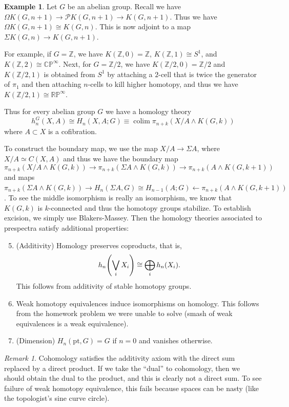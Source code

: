 \documentclass[leqno, openany]{memoir}
\theoremstyle{definition}
\newtheorem{exm}[thm]{Example}
\theoremstyle{remark}
\newtheorem{rmk}[thm]{Remark}
\theoremstyle{plain}
\theoremstyle{definition}
\theoremstyle{remark}
\newcommand{\R}{\mathbb{R}}
\newcommand{\C}{\mathbb{C}}
\newcommand{\Z}{\mathbb{Z}}
\renewcommand{\P}{\mathbb{P}}
\newcommand{\mc}[1]{\mathcal{#1}}
\newcommand{\mr}[1]{\mathrm{#1}}
\begin{document}
\begin{exm}
    Let $G$ be an abelian group. Recall we have $\Omega K(G, n+1) \to \mc{P} K(G, n+1) \to K(G, n+1)$. Thus we have $\Omega K(G, n+1) \cong K(G, n)$. This is now adjoint to a map $\Sigma K(G, n) \to K(G, n+1)$. 

    For example, if $G = \Z$, we have $K(\Z, 0) = \Z$, $K(\Z, 1) \cong S^1$, and $K(\Z, 2) \cong \C\P^{\infty}$. Next, for $G = \Z/2$, we have $K(\Z/2, 0) = \Z/2$ and $K(\Z/2, 1)$ is obtained from $S^1$ by attaching a $2$-cell that is twice the generator of $\pi_1$ and then attaching $n$-cells to kill higher homotopy, and thus we have $K(\Z/2, 1) \cong \R\P^{\infty}$. 

    Thus for every abelian group $G$ we have a homology theory 
    \[ h_n^G(X, A) \cong H_n(X,A;G) \equiv \operatorname{colim} \pi_{n+k}(X/A \wedge K(G, k)) \]
    where $A \subset X$ is a cofibration.
\end{exm}

To construct the boundary map, we use the map $X/A \to \Sigma A$, where $X/A \simeq C(X,A)$ and thus we have the boundary map
\[ \pi_{n+k}(X/A \wedge K(G, k)) \to \pi_{n+k}(\Sigma A \wedge K(G, k)) \to \pi_{n+k}(A \wedge K(G, k+1)) \]
and maps $\pi_{n+k}(\Sigma A \wedge K(G, k)) \to H_n(\Sigma A, G) \cong H_{n-1}(A;G) \gets \pi_{n+k}(A \wedge K(G, k+1))$.
To see the middle isomorphism is really an isomorphism, we know that $K(G, k)$ is $k$-connected and thus the homotopy groups stabilize. To establish excision, we simply use Blakers-Massey. Then the homology theories associated to prespectra satisfy additional properties:
\begin{enumerate}
    \setcounter{enumi}{4}
    \item (Additivity) Homology preserves coproducts, that is, 
        \[ h_n\qty(\bigvee_i X_i) \cong \bigoplus_i h_n(X_i). \]
        This follows from additivity of stable homotopy groups.
    \item Weak homotopy equivalences induce isomorphisms on homology. This follows from the homework problem we were unable to solve (smash of weak equivalences is a weak equivalence).
    \item (Dimension) $H_n(\mr{pt}, G) = G$ if $n=0$ and vanishes otherwise.
\end{enumerate}

\begin{rmk}
    Cohomology satisfies the additivity axiom with the direct sum replaced by a direct product. If we take the ``dual'' to cohomology, then we should obtain the dual to the product, and this is clearly not a direct sum. To see failure of weak homotopy equivalence, this fails because spaces can be nasty (like the topologist's sine curve circle).
\end{rmk}
\end{document}
